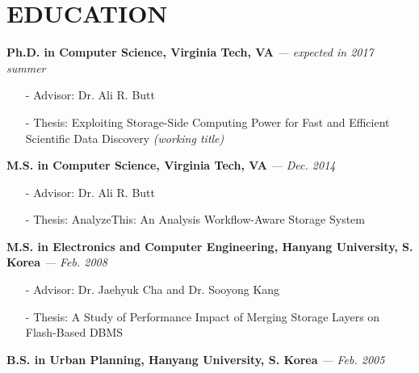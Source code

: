 \section{EDUCATION}
\vspace{0.03in} 
{\bf Ph.D. in Computer Science, Virginia Tech, VA}
{\footnotesize{\it --- expected in 2017 summer}}
\begin{itemize}[leftmargin=*]
\setlength\itemsep{-0.02in}
  \item[-] {\small Advisor: Dr. Ali R. Butt}
  \item[-] {\small Thesis: Exploiting Storage-Side Computing Power 
                   for Fast and Efficient Scientific Data Discovery
            {\footnotesize{\it(working title)}}}
\end{itemize}
\vspace{-0.15in}
{\bf M.S. in Computer Science, Virginia Tech, VA}
{\footnotesize{\it --- Dec. 2014}}
\begin{itemize}[leftmargin=*]
\setlength\itemsep{-0.02in}
  \item[-] {\small Advisor: Dr. Ali R. Butt}
  \item[-] {\small Thesis: AnalyzeThis: An Analysis Workflow-Aware Storage System}
\end{itemize}
\vspace{-0.15in}
{\bf M.S. in Electronics and Computer Engineering, Hanyang University, S. Korea}
{\footnotesize{\it --- Feb. 2008}}
\begin{itemize}[leftmargin=*]
\setlength\itemsep{-0.02in}
  \item[-] {\small Advisor: Dr. Jaehyuk Cha and Dr. Sooyong Kang}
  \item[-] {\small Thesis: A Study of Performance Impact of Merging Storage Layers on
  Flash-Based DBMS}
\end{itemize}
\vspace{-0.15in}
{\bf B.S. in Urban Planning, Hanyang University, S. Korea}
{\footnotesize{\it --- Feb. 2005}}

